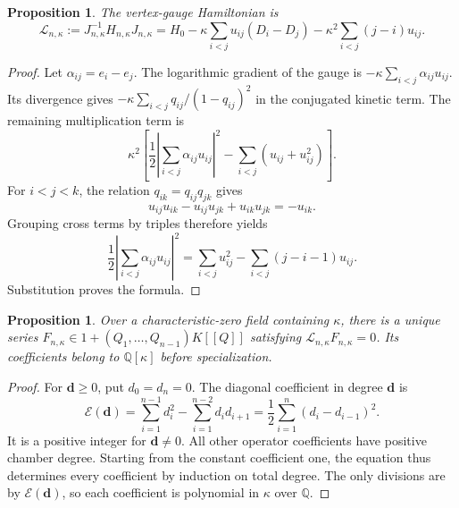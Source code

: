 \documentclass[11pt]{amsart}
\newtheorem{proposition}[theorem]{Proposition}
\theoremstyle{definition}
\theoremstyle{remark}
\numberwithin{equation}{section}
\newcommand{\Q}{\mathbb Q}
\begin{document}
\begin{proposition}\label{cg:gauge}
The vertex-gauge Hamiltonian is
\begin{equation}\label{cg:normalized-operator}
 \mathcal L_{n,\kappa}:=J_{n,\kappa}^{-1}H_{n,\kappa}J_{n,\kappa}
 =H_0-\kappa\sum_{i<j}u_{ij}(D_i-D_j)
      -\kappa^2\sum_{i<j}(j-i)u_{ij}.
\end{equation}
\end{proposition}

\begin{proof}
Let $\alpha_{ij}=e_i-e_j$. The logarithmic gradient of the gauge
is $-\kappa\sum_{i<j}\alpha_{ij}u_{ij}$. Its divergence gives
$-\kappa\sum_{i<j}q_{ij}/(1-q_{ij})^2$ in the conjugated kinetic
term. The remaining multiplication term is
\begin{equation}\label{cg:zero-order-intermediate}
 \kappa^2\left[
 \frac12\left|\sum_{i<j}\alpha_{ij}u_{ij}\right|^2
 -\sum_{i<j}(u_{ij}+u_{ij}^2)\right].
\end{equation}
For $i<j<k$, the relation $q_{ik}=q_{ij}q_{jk}$ gives
\[
 u_{ij}u_{ik}-u_{ij}u_{jk}+u_{ik}u_{jk}=-u_{ik}.
\]
Grouping cross terms by triples therefore yields
\[
 \frac12\left|\sum_{i<j}\alpha_{ij}u_{ij}\right|^2
 =\sum_{i<j}u_{ij}^2-\sum_{i<j}(j-i-1)u_{ij}.
\]
Substitution proves the formula.
\end{proof}

\begin{proposition}\label{cg:formal-uniqueness}
Over a characteristic-zero field containing $\kappa$, there is a
unique series $F_{n,\kappa}\in1+(Q_1,\ldots,Q_{n-1})K[[Q]]$
satisfying $\mathcal L_{n,\kappa}F_{n,\kappa}=0$.
Its coefficients belong to $\Q[\kappa]$ before specialization.
\end{proposition}

\begin{proof}
For $\boldsymbol d\geq0$, put $d_0=d_n=0$. The diagonal
coefficient in degree $\boldsymbol d$ is
\begin{equation}\label{cg:indicial-form}
 \mathcal E(\boldsymbol d)
 =\sum_{i=1}^{n-1}d_i^2-\sum_{i=1}^{n-2}d_id_{i+1}
 =\frac12\sum_{i=1}^n(d_i-d_{i-1})^2.
\end{equation}
It is a positive integer for $\boldsymbol d\ne0$.
All other operator coefficients have positive chamber degree.
Starting from the constant coefficient one, the equation thus
determines every coefficient by induction on total degree.
The only divisions are by $\mathcal E(\boldsymbol d)$, so each
coefficient is polynomial in $\kappa$ over $\Q$.
\end{proof}
\end{document}
